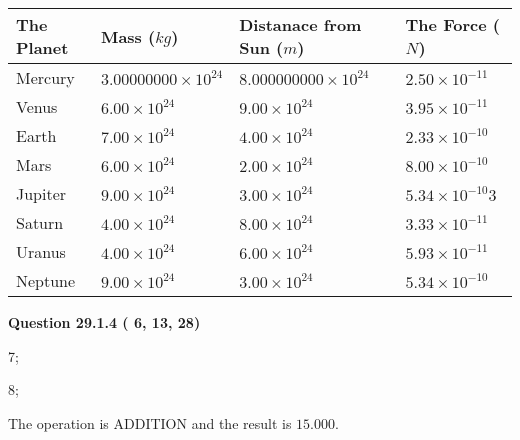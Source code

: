 \documentclass[12pt]{article}
\begin{document}
 
\begin{tabular}{|l|l|l|l|}
\hline
The Planet & Mass ($kg$) & Distanace from Sun ($m$) & The Force ($N$)\\
\hline
Mercury  &
           $ %
3.00000000 \times 10^{24}  $   &
             $ %
8.000000000 \times 10^{24}$    & $ %
2.50 \times 10^{-11} $
\\  \hline
Venus    &
           $  %
6.00 \times 10^{24}  $     &
             $ %
9.00 \times 10^{24} $    & $ %
3.95 \times 10^{-11} $
\\  \hline
Earth    &
           $  %
7.00 \times 10^{24}$     &
             $ %
4.00 \times 10^{24} $    & $ %
2.33 \times 10^{-10} $
\\   \hline
Mars     &
           $  %
6.00 \times 10^{24} $     &
             $ %
2.00 \times 10^{24}$    & $ %
8.00 \times 10^{-10} $
\\   \hline
Jupiter  &
           $  %
9.00 \times 10^{24}  $    &
             $ %
3.00 \times 10^{24} $    & $ %
5.34 \times 10^{-10}3 $
\\  \hline
Saturn   &
           $  %
4.00 \times 10^{24}   $    &
             $ %
8.00 \times 10^{24}  $    & $ %
3.33 \times 10^{-11} $
\\  \hline
Uranus   &
           $  %
4.00 \times 10^{24} $    &
             $ %
6.00 \times 10^{24}$    & $ %
5.93 \times 10^{-11} $
\\  \hline
Neptune  &
           $  %
9.00 \times 10^{24}  $    &
             $ %
3.00 \times 10^{24} $    & $ %
5.34 \times 10^{-10} $
\\  \hline
 
\end{tabular}
 
 
 
 
  
\vspace{0.2in}
  
{\textbf{\Large{Question
29.1.4 
 (          6,         13,         28)
}}}
  
  
 
 
\noindent{}

7;
 
8;
 
The operation is  %
ADDITION and the result is
$ %
15.000$.
 
 
 
  
\vspace{0.2in}
  
\end{document}
